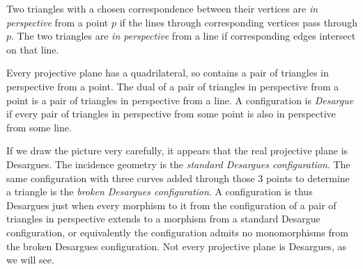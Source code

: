 \documentclass{amsart}
\newcommand*{\define}[1]{}
\begin{document}
Two triangles with a chosen correspondence between their vertices are \emph{in perspective}\define{perspective} from a point \(p\) if the lines through corresponding vertices pass through \(p\).
The two triangles are \emph{in perspective}\define{perspective} from a line if corresponding edges intersect on that line.

Every projective plane has a quadrilateral, so contains a pair of triangles in perspective from a point.
The dual of a pair of triangles in perspective from a point is a pair of triangles in perspective from a line.
A configuration is \emph{Desargue}\define{Desargues!projective plane}\define{projective!plane!Desargues} if every pair of triangles in perspective from some point is also in perspective from some line.

If we draw the picture very carefully, it appears that the real projective plane is Desargues.
The incidence geometry
is the \emph{standard Desargues configuration}\define{standard Desargues configuration}\define{Desargues!configuration!standard}\define{configuration!standard Desargues}.
The same configuration with three curves added through those 3 points to determine a triangle is the \emph{broken Desargues configuration}\define{broken Desargues configuration}\define{Desargues!configuration!broken}\define{configuration!broken Desargues}.
A configuration is thus Desargues just when every morphism to it from the configuration of a pair of triangles in perspective extends to a morphism from a standard Desargue configuration, or equivalently the configuration admits no monomorphisms from the broken Desargues configuration.
Not every projective plane is Desargues, as we will see.
\end{document}
